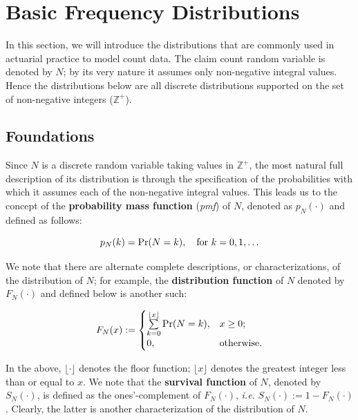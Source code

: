 \documentclass[]{book}
\theoremstyle{definition}
\theoremstyle{definition}
\theoremstyle{definition}
\theoremstyle{remark}
\begin{document}
\section{Basic Frequency
Distributions}\label{S:basic-frequency-distributions}

In this section, we will introduce the distributions that are commonly
used in actuarial practice to model count data. The claim count random
variable is denoted by \(N\); by its very nature it assumes only
non-negative integral values. Hence the distributions below are all
discrete distributions supported on the set of non-negative integers
(\(\mathbb{Z}^+\)).

\subsection{Foundations}\label{S:foundations}

Since \(N\) is a discrete random variable taking values in
\(\mathbb{Z}^+\), the most natural full description of its distribution
is through the specification of the probabilities with which it assumes
each of the non-negative integral values. This leads us to the concept
of the \textbf{probability mass function} (\emph{pmf}) of \(N\), denoted
as \(p_N(\cdot)\) and defined as follows:

\begin{equation}
p_N(k)=\Pr(N=k), \quad \hbox{for } k=0,1,\ldots
\end{equation}

We note that there are alternate complete descriptions, or
characterizations, of the distribution of \(N\); for example, the
\textbf{distribution function} of \(N\) denoted by \(F_N(\cdot)\) and
defined below is another such:

\begin{equation}
F_N(x):=\begin{cases}
\sum\limits_{k=0}^{\lfloor x \rfloor } \Pr(N=k), &x\geq 0;\\
0, & \hbox{otherwise}.
\end{cases}
\end{equation}

In the above, \(\lfloor \cdot \rfloor\) denotes the floor function;
\(\lfloor x \rfloor\) denotes the greatest integer less than or equal to
\(x\). We note that the \textbf{survival function} of \(N\), denoted by
\(S_N(\cdot)\), is defined as the ones'-complement of \(F_N(\cdot)\),
\emph{i.e.} \(S_N(\cdot):=1-F_N(\cdot)\). Clearly, the latter is another
characterization of the distribution of \(N\).
\end{document}
